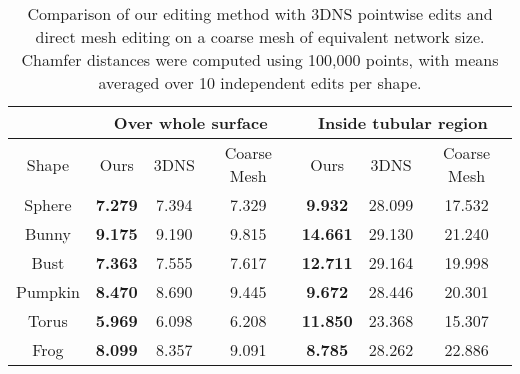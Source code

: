 \begin{table*}[htbp]
\begin{minipage}{0.58\textwidth}
\begin{tabular}{|ccccccc|}
    \multicolumn{1}{|c|}{}        & \multicolumn{3}{c|}{Over whole surface}                                                             & \multicolumn{3}{c|}{Inside tubular region}                                       \\ \hline
    \multicolumn{1}{|c|}{Shape}   & \multicolumn{1}{c|}{Ours}           & \multicolumn{1}{c|}{3DNS}  & \multicolumn{1}{c|}{Coarse Mesh} & \multicolumn{1}{c|}{Ours}            & \multicolumn{1}{c|}{3DNS}   & Coarse Mesh \\ \hline
    \multicolumn{1}{|c|}{Sphere}  & \multicolumn{1}{c|}{\textbf{7.279}} & \multicolumn{1}{c|}{7.394} & \multicolumn{1}{c|}{7.329}       & \multicolumn{1}{c|}{\textbf{9.932}}  & \multicolumn{1}{c|}{28.099} & 17.532      \\ \hline
    \multicolumn{1}{|c|}{Bunny}   & \multicolumn{1}{c|}{\textbf{9.175}} & \multicolumn{1}{c|}{9.190} & \multicolumn{1}{c|}{9.815}       & \multicolumn{1}{c|}{\textbf{14.661}} & \multicolumn{1}{c|}{29.130} & 21.240      \\ \hline
    \multicolumn{1}{|c|}{Bust}    & \multicolumn{1}{c|}{\textbf{7.363}} & \multicolumn{1}{c|}{7.555} & \multicolumn{1}{c|}{7.617}       & \multicolumn{1}{c|}{\textbf{12.711}} & \multicolumn{1}{c|}{29.164} & 19.998      \\ \hline
    \multicolumn{1}{|c|}{Pumpkin} & \multicolumn{1}{c|}{\textbf{8.470}} & \multicolumn{1}{c|}{8.690} & \multicolumn{1}{c|}{9.445}       & \multicolumn{1}{c|}{\textbf{9.672}}  & \multicolumn{1}{c|}{28.446} & 20.301      \\ \hline
    \multicolumn{1}{|c|}{Torus}   & \multicolumn{1}{c|}{\textbf{5.969}} & \multicolumn{1}{c|}{6.098} & \multicolumn{1}{c|}{6.208}       & \multicolumn{1}{c|}{\textbf{11.850}} & \multicolumn{1}{c|}{23.368} & 15.307      \\ \hline
    \multicolumn{1}{|c|}{Frog}    & \multicolumn{1}{c|}{\textbf{8.099}} & \multicolumn{1}{c|}{8.357} & \multicolumn{1}{c|}{9.091}       & \multicolumn{1}{c|}{\textbf{8.785}}  & \multicolumn{1}{c|}{28.262} & 22.886      \\ \hline
    \end{tabular}
    \caption{Comparison of our editing method with 3DNS pointwise edits and direct mesh editing on a coarse mesh of equivalent network size. Chamfer distances were computed using 100,000 points, with means averaged over 10 independent edits per shape.}
    \label{tab:chamfer}
    \vspace{-1em}
  \end{minipage}%

\end{table*}
